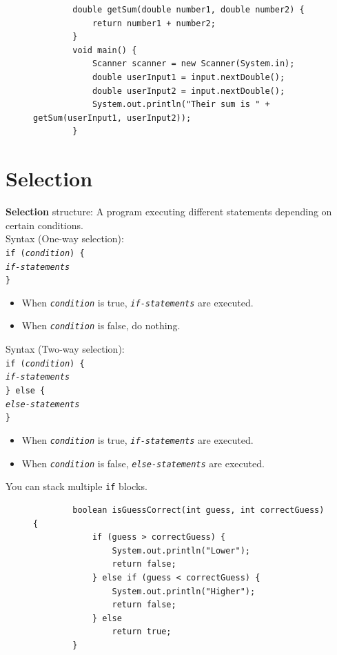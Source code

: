 \documentclass{article}
\begin{document}
\begin{figure}[h!]
	\centering
	\begin{verbatim}
		double getSum(double number1, double number2) {
		    return number1 + number2;
		}
		void main() {
		    Scanner scanner = new Scanner(System.in);
		    double userInput1 = input.nextDouble();
		    double userInput2 = input.nextDouble();
		    System.out.println("Their sum is " + getSum(userInput1, userInput2));
		}
	\end{verbatim}
\end{figure}
\newpage

\section{Selection}
\textbf{Selection} structure: A program executing different statements depending on certain conditions.\\
Syntax (One-way selection):\\
\texttt{if (\textit{condition}) \{\\
	\hspace*{2em} \textit{if-statements}\\
	\}}
\begin{itemize}
	\item When \texttt{\textit{condition}} is true, \texttt{\textit{if-statements}} are executed.
	\item When \texttt{\textit{condition}} is false, do nothing.
\end{itemize}
Syntax (Two-way selection):\\
\texttt{if (\textit{condition}) \{\\
\hspace*{2em} \textit{if-statements}\\
\} else \{\\
\hspace*{2em} \textit{else-statements}\\
\}}
\begin{itemize}
	\item When \texttt{\textit{condition}} is true, \texttt{\textit{if-statements}} are executed.
	\item When \texttt{\textit{condition}} is false, \texttt{\textit{else-statements}} are executed.
\end{itemize}
You can stack multiple \texttt{if} blocks.

\begin{figure}[h]
	\centering
	\begin{verbatim}
		boolean isGuessCorrect(int guess, int correctGuess) {
		    if (guess > correctGuess) {
		        System.out.println("Lower");
		        return false;
		    } else if (guess < correctGuess) {
		        System.out.println("Higher");
		        return false;
		    } else
		        return true;
		}
	\end{verbatim}
\end{figure}
\end{document}
